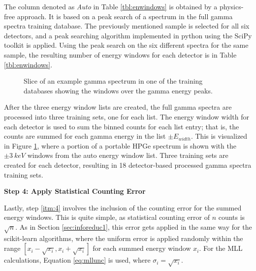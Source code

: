The column denoted as \textit{Auto} in Table \ref{tbl:enwindows} is obtained by
a physics-free approach. It is based on a peak search of a spectrum in the full
gamma spectra training database. The previously mentioned sample is selected
for all six detectors, and a peak searching algorithm implemented in python
using the SciPy toolkit \cite{scipy} is applied. Using the peak search on the
six different spectra for the same sample, the resulting number of energy
windows for each detector is in Table \ref{tbl:enwindows}.  

\begin{figure}[!htb]
  \caption{Slice of an example gamma spectrum in one of the training databases
           showing the windows over the gamma energy peaks.}
  \label{fig:enwindows}
\end{figure}

After the three energy window lists are created, the full gamma spectra are
processed into three training sets, one for each list.  The energy window width
for each detector is used to sum the binned counts for each list entry; that
is, the counts are summed for each gamma energy in the list $\pm E_{width}$.
This is visualized in Figure \ref{fig:enwindows}, where a portion of a portable
\gls{HPGe} spectrum is shown with the $\pm3\:keV$ windows from the auto energy
window list.  Three training sets are created for each detector, resulting in
18 detector-based processed gamma spectra training sets.

\noindent \textbf{Step 4: Apply Statistical Counting Error}

Lastly, step \ref{itm:4} involves the inclusion of the counting error for the
summed energy windows. This is quite simple, as statistical counting error of
$n$ counts is $\sqrt{n}$.  As in Section \ref{sec:inforeduc1}, this error gets
applied in the same way for the scikit-learn algorithms, where the uniform
error is applied randomly within the range $[x_i - \sqrt{x_i}, x_i +
\sqrt{x_i}]$ for each summed energy window $x_i$. For the \gls{MLL}
calculations, Equation \ref{eq:mllunc} is used, where $\sigma_{i} =
\sqrt{x_i}$.  
